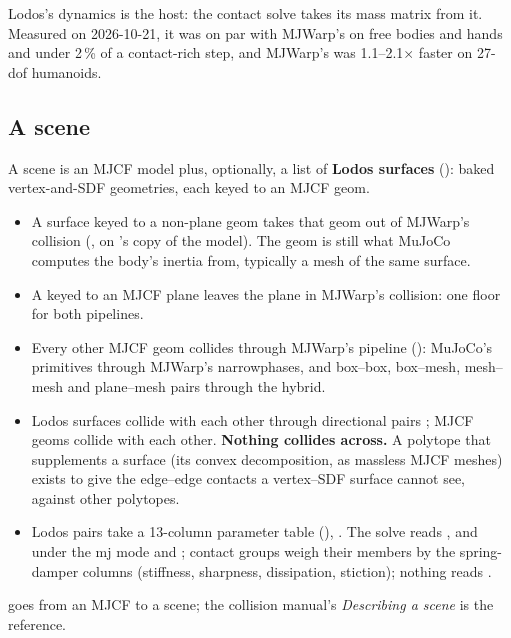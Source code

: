 Lodos's dynamics is the host: the contact solve takes its mass matrix from it. Measured on 2026-10-21, it was on par with MJWarp's on free bodies and hands and under 2\,\% of a contact-rich step, and MJWarp's was 1.1--2.1$\times$ faster on 27-dof humanoids.

\subsection{A scene}\label{sec:scene}

A scene is an MJCF model plus, optionally, a list of \textbf{Lodos surfaces} (): baked vertex-and-SDF geometries, each keyed to an MJCF geom.

\begin{itemize}
\item A surface keyed to a non-plane geom takes that geom out of MJWarp's collision (, on 's copy of the model). The geom is still what MuJoCo computes the body's inertia from, typically a mesh of the same surface.
\item A  keyed to an MJCF plane leaves the plane in MJWarp's collision: one floor for both pipelines.
\item Every other MJCF geom collides through MJWarp's pipeline (): MuJoCo's primitives through MJWarp's narrowphases, and box--box, box--mesh, mesh--mesh and plane--mesh pairs through the hybrid.
\item Lodos surfaces collide with each other through directional pairs ; MJCF geoms collide with each other. \textbf{Nothing collides across.} A polytope that supplements a surface (its convex decomposition, as massless MJCF meshes) exists to give the edge--edge contacts a vertex--SDF surface cannot see, against other polytopes.
\item Lodos pairs take a 13-column parameter table (), . The solve reads , and under the mj mode  and ; contact groups weigh their members by the spring-damper columns (stiffness, sharpness, dissipation, stiction); nothing reads .
\end{itemize}

 goes from an MJCF to a scene; the collision manual's \emph{Describing a scene} is the reference.

